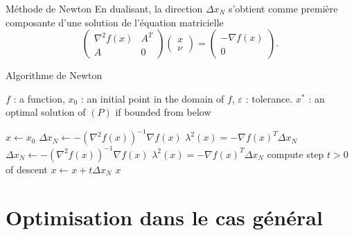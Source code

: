 \documentclass[aspectratio = 169]{beamer}
\begin{document}
\begin{frame}{Méthode de Newton}
  En dualisant, la direction $\Delta x_N$ s'obtient comme première
  composante d'une solution de l'équation matricielle
    \begin{equation}
    \label{KKT-PQb}
    \tag{KKT-$P_Q$}
    \begin{pmatrix}
      \nabla^2f(x) & A^T \\
      A & 0
    \end{pmatrix}
    \begin{pmatrix}
      x \\ \nu
    \end{pmatrix}
    =
    \begin{pmatrix}
      -\nabla f(x) \\ 0
    \end{pmatrix}.
  \end{equation}
\end{frame}

\begin{frame}{Algorithme de Newton}
    \begin{algorithm}[H]
    \caption{Méthode de Newton}
    \small{
      \begin{algorithmic}[1]
        \Statex
        \Require $f$ : a function,  $x_0$ : an initial point in the domain of $f$, $\varepsilon$ : tolerance.
        \Ensure $x^*$ : an optimal solution of $(P)$ if bounded from below

        \State $x \leftarrow x_0$
        \State $\Delta x_N \leftarrow -\left(\nabla^2 f(x)\right)^{-1}\nabla f(x)$
        \State $\lambda^2(x) = -\nabla f(x)^T\Delta x_N$
        \State $\Delta x_N \leftarrow -\left(\nabla^2 f(x)\right)^{-1}\nabla f(x)$
        \State $\lambda^2(x) = -\nabla f(x)^T\Delta x_N$
        \State compute step $t > 0$ of descent
        \State $x \leftarrow x + t\Delta x_N$
        \EndWhile
        \State \Return $x$
        \EndFunction
        \Statex
      \end{algorithmic}
    }
  \end{algorithm}
\end{frame}

\section{Optimisation dans le cas général}
\end{document}
